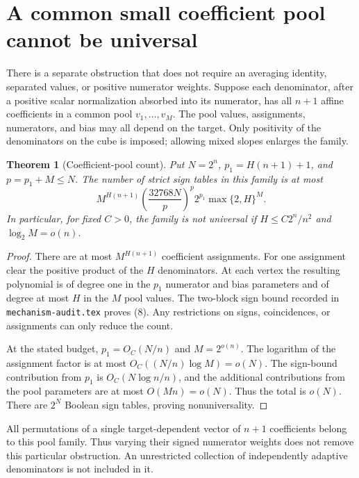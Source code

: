 \documentclass[11pt]{article}
\newtheorem{theorem}{Theorem}
\begin{document}
\section{A common small coefficient pool cannot be universal}

There is a separate obstruction that does not require an averaging
identity, separated values, or positive numerator weights. Suppose
each denominator, after a positive scalar normalization absorbed into
its numerator, has all $n+1$ affine coefficients in a common pool
$v_1,\ldots,v_M$. The pool values, assignments, numerators, and bias
may all depend on the target. Only positivity of the denominators
on the cube is imposed; allowing mixed slopes enlarges the family.

\begin{theorem}[Coefficient-pool count]
Put $N=2^n$, $p_1=H(n+1)+1$, and $p=p_1+M\le N$.
The number of strict sign tables in this family is at most
\[
 M^{H(n+1)}
 \left(\frac{32768N}{p}\right)^p
                     2^{p_1}\max\{2,H\}^{M}.
 \tag{8}
\]
In particular, for fixed $C>0$, the family is not universal if
$H\le C2^n/n^2$ and $\log_2 M=o(n)$.
\end{theorem}
\begin{proof}
There are at most $M^{H(n+1)}$ coefficient assignments. For one
assignment clear the positive product of the $H$ denominators.
At each vertex the resulting polynomial is of degree one in the
$p_1$ numerator and bias parameters and of degree at most $H$
in the $M$ pool values. The two-block sign bound recorded in
\texttt{mechanism-audit.tex} proves (8). Any restrictions on signs,
coincidences, or assignments can only reduce the count.

At the stated budget, $p_1=O_C(N/n)$ and $M=2^{o(n)}$.
The logarithm of the assignment factor is at most
$O_C((N/n)\log M)=o(N)$. The sign-bound contribution from $p_1$
is $O_C(N\log n/n)$, and the additional contributions from the
pool parameters are at most $O(Mn)=o(N)$. Thus the total is $o(N)$.
There are $2^N$ Boolean sign tables, proving nonuniversality.
\end{proof}

All permutations of a single target-dependent vector of $n+1$
coefficients belong to this pool family. Thus varying their signed
numerator weights does not remove this particular obstruction. An
unrestricted collection of independently adaptive denominators is
not included in it.
\end{document}
